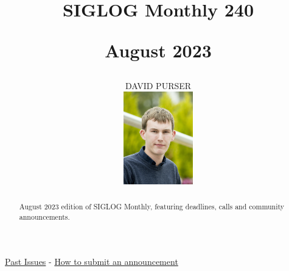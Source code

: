 \documentclass[prodmode,acmtecs]{acmsmall} %
\newcounter{colstart}
\begin{document}
\setcounter{colstart}{\thepage}

\title{{\huge\sc SIGLOG Monthly 240}

 August 2023}
\author{DAVID PURSER
\vspace*{-2.6cm}\begin{flushright}\includegraphics[width=30mm]{dp}\end{flushright}
}

\begin{abstract}
August 2023 edition of SIGLOG Monthly, featuring deadlines, calls and community announcements.
\end{abstract}


\maketitlee

\href{https://lics.siglog.org/newsletters/}{Past Issues}
 - 
\href{https://lics.siglog.org/newsletters/inst.html}{How to submit an announcement}
\end{document}
